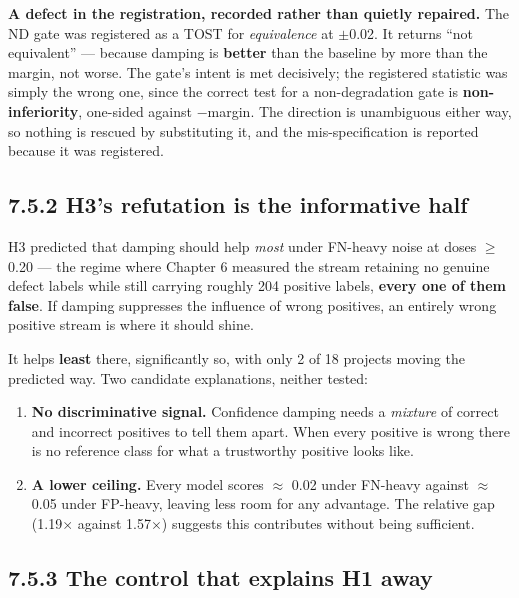 \textbf{A defect in the registration, recorded rather than quietly
repaired.} The ND gate was registered as a TOST for \emph{equivalence}
at \ensuremath{\pm}0.02. It returns ``not equivalent'' --- because damping is
\textbf{better} than the baseline by more than the margin, not worse.
The gate's intent is met decisively; the registered statistic was simply
the wrong one, since the correct test for a non-degradation gate is
\textbf{non-inferiority}, one-sided against \ensuremath{-}margin. The direction is
unambiguous either way, so nothing is rescued by substituting it, and
the mis-specification is reported because it was registered.

\subsection{7.5.2 H3's refutation is the informative
half}\label{h3s-refutation-is-the-informative-half}

H3 predicted that damping should help \emph{most} under FN-heavy noise
at doses \ensuremath{\geq} 0.20 --- the regime where Chapter 6 measured the stream
retaining no genuine defect labels while still carrying roughly 204
positive labels, \textbf{every one of them false}. If damping suppresses
the influence of wrong positives, an entirely wrong positive stream is
where it should shine.

It helps \textbf{least} there, significantly so, with only 2 of 18
projects moving the predicted way. Two candidate explanations, neither
tested:

\begin{enumerate}
\def\labelenumi{\arabic{enumi}.}
\tightlist
\item
  \textbf{No discriminative signal.} Confidence damping needs a
  \emph{mixture} of correct and incorrect positives to tell them apart.
  When every positive is wrong there is no reference class for what a
  trustworthy positive looks like.
\item
  \textbf{A lower ceiling.} Every model scores \ensuremath{\approx} 0.02 under FN-heavy
  against \ensuremath{\approx} 0.05 under FP-heavy, leaving less room for any advantage.
  The relative gap (1.19\ensuremath{\times} against 1.57\ensuremath{\times}) suggests this contributes
  without being sufficient.
\end{enumerate}

\subsection{7.5.3 The control that explains H1
away}\label{the-control-that-explains-h1-away}

